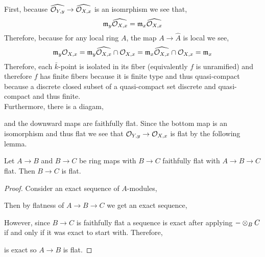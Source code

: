 \documentclass[12pt]{article}
\begin{document}
\bigskip\\
First, because $\widehat{\mathcal{O}_{Y, y}} \to \widehat{\mathcal{O}_{X, x}}$ is an isomrphism we see that,
\[ \mathfrak{m}_y \widehat{\mathcal{O}_{X, x}} = \mathfrak{m}_x \widehat{\mathcal{O}_{X, x}} \]
Therefore, because for any local ring $A$, the map $A \to \hat{A}$ is local we see,
\[ \mathfrak{m}_y \mathcal{O}_{X, x} = \mathfrak{m}_y \widehat{\mathcal{O}_{X, x}} \cap \mathcal{O}_{X, x} = \mathfrak{m}_x \widehat{\mathcal{O}_{X, x}} \cap \mathcal{O}_{X, x} = \mathfrak{m}_x \]
Therefore, each $\bar{k}$-point is isolated in its fiber (equivalently $f$ is unramified) and therefore $f$ has finite fibers because it is finite type and thus quasi-compact because a discrete closed subset of a quasi-compact set discrete and quasi-compact and thus finite.
\bigskip\\
Furthermore, there is a diagam,
\begin{center}
\end{center}
and the downward maps are faithfully flat. Since the bottom map is an isomorphism and thus flat we see that $\mathcal{O}_{Y, y} \to \mathcal{O}_{X, x}$ is flat by the following lemma.

\begin{lemma}
Let $A \to B$ and $B \to C$ be ring maps with $B \to C$ faithfully flat with $A \to B \to C$ flat. Then $B \to C$ is flat.
\end{lemma}

\begin{proof}
Consider an exact sequence of $A$-modules,
\begin{center}
\end{center}
Then by flatness of $A \to B \to C$ we get an exact sequence,
\begin{center}
\end{center}
However, since $B \to C$ is faithfully flat a sequence is exact after applying $- \otimes_B C$ if and only if it was exact to start with. Therefore, 
\begin{center}
\end{center}
is exact so $A \to B$ is flat.
\end{proof}
\end{document}
